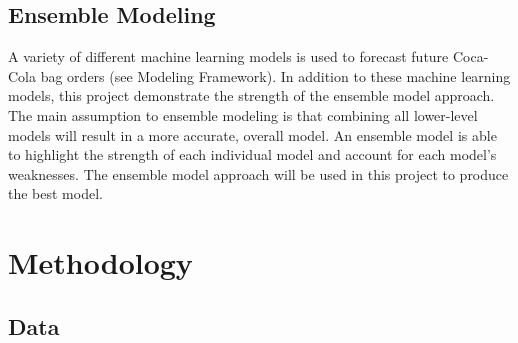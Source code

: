 \documentclass[12pt,oneside]{chicagocapstone}
\begin{document}
\hypertarget{ensemble-modeling}{%
\section*{Ensemble Modeling}\label{ensemble-modeling}}

A variety of different machine learning models is used to forecast future Coca-Cola bag orders (see Modeling Framework). In addition to these machine learning models, this project demonstrate the strength of the ensemble model approach. The main assumption to ensemble modeling is that combining all lower-level models will result in a more accurate, overall model. An ensemble model is able to highlight the strength of each individual model and account for each model's weaknesses. The ensemble model approach will be used in this project to produce the best model.

\newpage

\hypertarget{methodology}{%
\chapter*{Methodology}\label{methodology}}

\hypertarget{methodology-data}{%
\section*{Data}\label{methodology-data}}
\end{document}
